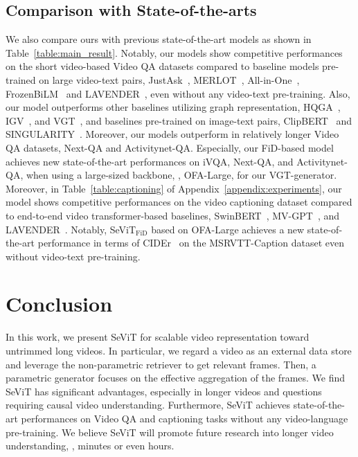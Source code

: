\documentclass{article}
\newcommand{\frameworkname}{SeViT}
\begin{document}
\subsection{Comparison with State-of-the-arts}


We also compare ours with previous state-of-the-art models as shown in Table~\ref{table:main_result}. Notably, our models show competitive performances on the short video-based Video QA datasets compared to baseline models pre-trained on large video-text pairs, JustAsk~\cite{yang2021just}, MERLOT~\cite{zellers2021merlot}, All-in-One~\cite{wang2022all}, FrozenBiLM~\cite{yang2022zero} and LAVENDER~\cite{li2022lavender}, even without any video-text pre-training. Also, our model outperforms other baselines utilizing graph representation, HQGA~\cite{xiao2022video}, IGV~\cite{li2022invariant}, and VGT~\cite{xiao2022videotransformer}, and baselines pre-trained on image-text pairs, ClipBERT~\cite{lei2021less} and SINGULARITY~\cite{lei2022revealing}. Moreover, our models outperform in relatively longer Video QA datasets, Next-QA and Activitynet-QA. Especially, our FiD-based model achieves new state-of-the-art performances on iVQA, Next-QA, and Activitynet-QA, when using a large-sized backbone, \ie, OFA-Large, for our VGT-generator. Moreover, in Table~\ref{table:captioning} of Appendix~\ref{appendix:experiments}, our model shows competitive performances on the video captioning dataset compared to end-to-end video transformer-based baselines, SwinBERT~\cite{lin2022swinbert}, MV-GPT~\cite{seo2022end}, and LAVENDER~\cite{ li2022lavender}. Notably, \frameworkname{}$_\text{FiD}$ based on OFA-Large achieves a new state-of-the-art performance in terms of CIDEr~\cite{vedantam2015cider} on the MSRVTT-Caption dataset even without video-text pre-training.
 \section{Conclusion}

In this work, we present \frameworkname{} for scalable video representation toward untrimmed long videos. In particular, we regard a video as an external data store and leverage the non-parametric retriever to get relevant frames. Then, a parametric generator focuses on the effective aggregation of the frames. We find \frameworkname{} has significant advantages, especially in longer videos and questions requiring causal video understanding. Furthermore, \frameworkname{} achieves state-of-the-art performances on Video QA and captioning tasks without any video-language pre-training. We believe \frameworkname{} will promote future research into longer video understanding, \eg, minutes or even hours. 


\end{document}
